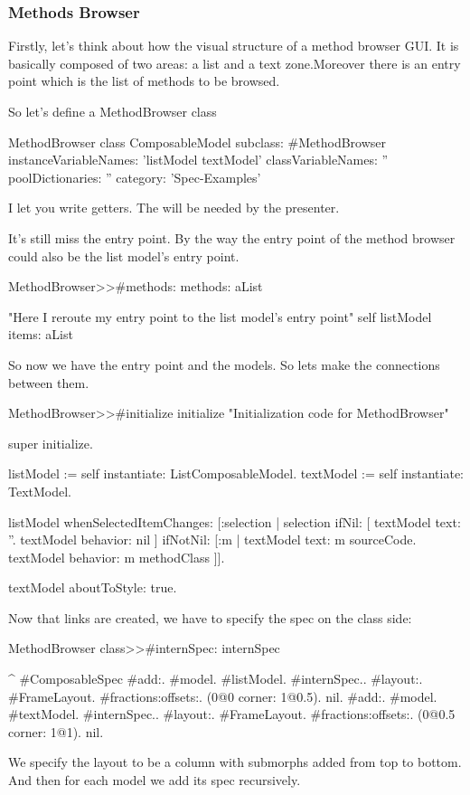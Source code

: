 \documentclass[a4paper,10pt,twoside]{book}
\begin{document}
\subsubsection{Methods Browser}

Firstly, let's think about how the visual structure of a method browser GUI. It is basically composed of two areas: a list and a text zone.Moreover there is an entry point which is the list of methods to be browsed.

So let's define a MethodBrowser class

\begin{classdef}{MethodBrowser class}
ComposableModel subclass: #MethodBrowser
	instanceVariableNames: 'listModel textModel'
	classVariableNames: ''
	poolDictionaries: ''
	category: 'Spec-Examples'
\end{classdef}

I let you write getters. The will be needed by the presenter.

It's still miss the entry point. By the way the entry point of the method browser could also be the list model's entry point.

\begin{method}{MethodBrowser>>\#methods:}
methods: aList

	"Here I reroute my entry point to the list model's entry point"
	self listModel items: aList
\end{method}

So now we have the entry point and the models. So lets make the connections between them.

\begin{method}{MethodBrowser>>\#initialize}
initialize
	"Initialization code for MethodBrowser"

	super initialize.

	listModel := self instantiate: ListComposableModel.
	textModel := self instantiate: TextModel.
		
	listModel whenSelectedItemChanges: [:selection |
		selection
			ifNil: [
				textModel text: ''.
				textModel behavior: nil ]
			ifNotNil: [:m | 
				textModel text: m sourceCode.
				textModel behavior: m methodClass ]].
	
	textModel aboutToStyle: true.
\end{method}

Now that links are created, we have to specify the spec on the class side:

\begin{method}{MethodBrowser class>>\#internSpec:}
internSpec

	^{ #ComposableSpec
			#add:. {{#model. #listModel. #internSpec.}.
						#layout:. {#FrameLayout.
									#fractions:offsets:. (0@0 corner: 1@0.5). nil}}.
			#add:. {{#model. #textModel. #internSpec.}.
						#layout:. {#FrameLayout.
									#fractions:offsets:. (0@0.5 corner: 1@1). nil}}}.
\end{method}
%
We specify the layout to be a column with submorphs added from top to bottom. And then for each model we add its spec recursively.
\end{document}
